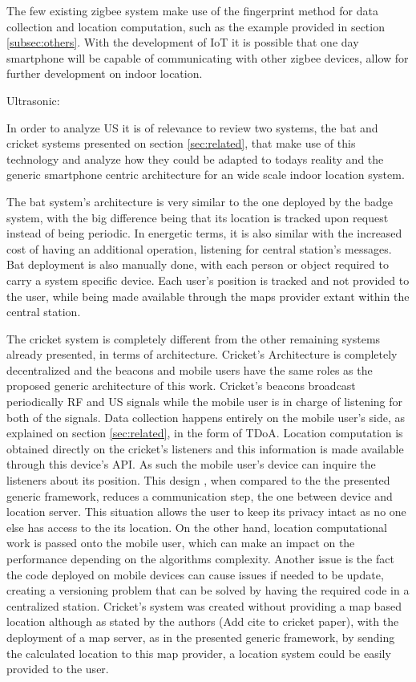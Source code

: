 	The few existing zigbee system make use of the fingerprint method for data collection and location computation, such as the example provided in section \ref{subsec:others}. With the development of IoT it is possible that one day smartphone will be capable of communicating with other zigbee devices, allow for further development on indoor location.


Ultrasonic:

	In order to analyze \ac{US} it is of relevance to review two systems, the bat and cricket systems presented on section \ref{sec:related}, that make use of this technology and analyze how they could be adapted to todays reality and the generic smartphone centric architecture for an wide scale indoor location system.

	The bat system's architecture is very similar to the one deployed by the badge system, with the big difference being that its location is tracked upon request instead of being periodic. In energetic terms, it is also similar with the increased cost of having an additional operation, listening for central station's messages. Bat deployment is also manually done, with each person or object required to carry a system specific device. Each user's position is tracked and not provided to the user, while being made available through the maps provider extant within the central station.

	The cricket system is completely different from the other remaining systems already presented, in terms of architecture. Cricket's Architecture is completely decentralized and the beacons and mobile users have the same roles as the proposed generic architecture of this work. Cricket's beacons broadcast periodically RF and US signals while the mobile user is in charge of listening for both of the signals. Data collection happens entirely on the mobile user's side, as explained on section \ref{sec:related}, in the form of \ac{TDoA}. Location computation is obtained directly on the cricket's listeners and this information is made available through this device's API. As such the mobile user's device can inquire the listeners about its position. This design , when compared to the the presented generic framework, reduces a communication step, the one between device and location server. This situation allows the user to keep its privacy intact as no one else has access to the its location. On the other hand, location computational work is passed onto the mobile user, which can make an impact on the performance depending on the algorithms complexity. Another issue is the fact the code deployed on mobile devices can cause issues if needed to be update, creating a versioning problem that can be solved by having the required code in a centralized station. Cricket's system was created without providing a map based location although as stated by the authors (Add cite to cricket paper), with the deployment of a map server, as in the presented generic framework, by sending the calculated location to this map provider, a location system could be easily provided to the user.

